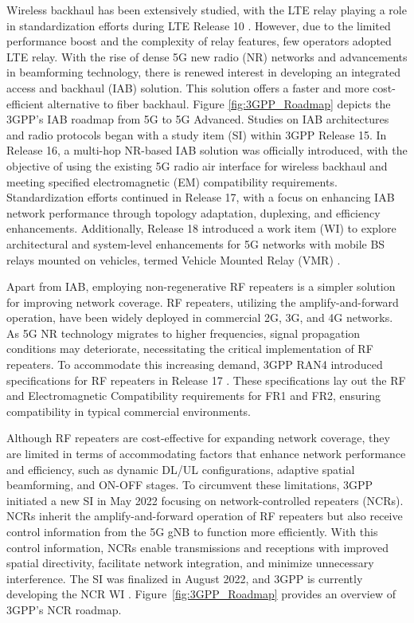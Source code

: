 \documentclass[lettersize,journal]{IEEEtran}
\begin{document}
Wireless backhaul has been extensively studied, with the LTE relay playing a role in standardization efforts during LTE Release 10 \cite{3GPP-Rel10}. However, due to the limited performance boost and the complexity of relay features, few operators adopted LTE relay. With the rise of dense 5G new radio (NR) networks and advancements in beamforming technology, there is renewed interest in developing an integrated access and backhaul (IAB) solution. This solution offers a faster and more cost-efficient alternative to fiber backhaul. Figure \ref{fig:3GPP_Roadmap} depicts the 3GPP's IAB roadmap from 5G to 5G Advanced. Studies on IAB architectures and radio protocols began with a study item (SI) within 3GPP Release 15. In Release 16, a multi-hop NR-based IAB solution was officially introduced, with the objective of using the existing 5G radio air interface for wireless backhaul and meeting specified electromagnetic (EM) compatibility requirements. Standardization efforts continued in Release 17, with a focus on enhancing IAB network performance through topology adaptation, duplexing, and efficiency enhancements. Additionally, Release 18 introduced a work item (WI) to explore architectural and system-level enhancements for 5G networks with mobile BS relays mounted on vehicles, termed Vehicle Mounted Relay (VMR) \cite{TR-23.700}.

Apart from IAB, employing non-regenerative RF repeaters is a simpler solution for improving network coverage. RF repeaters, utilizing the amplify-and-forward operation, have been widely deployed in commercial 2G, 3G, and 4G networks. As 5G NR technology migrates to higher frequencies, signal propagation conditions may deteriorate, necessitating the critical implementation of RF repeaters. To accommodate this increasing demand, 3GPP RAN4 introduced specifications for RF repeaters in Release 17 \cite{RP-202813}. These specifications lay out the RF and Electromagnetic Compatibility requirements for FR1 and FR2, ensuring compatibility in typical commercial environments.

Although RF repeaters are cost-effective for expanding network coverage, they are limited in terms of accommodating factors that enhance network performance and efficiency, such as dynamic DL/UL configurations, adaptive spatial beamforming, and ON-OFF stages. To circumvent these limitations, 3GPP initiated a new SI in May 2022 focusing on network-controlled repeaters (NCRs). NCRs inherit the amplify-and-forward operation of RF repeaters but also receive control information from the 5G gNB to function more efficiently. With this control information, NCRs enable transmissions and receptions with improved spatial directivity, facilitate network integration, and minimize unnecessary interference. The SI was finalized in August 2022, and 3GPP is currently developing the NCR WI \cite{RP-222673}. Figure~\ref{fig:3GPP_Roadmap} provides an overview of 3GPP's NCR roadmap.
\end{document}
